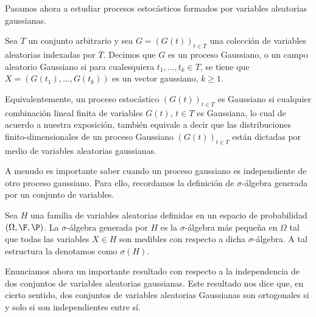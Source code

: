  Pasamos ahora a estudiar procesos estocásticos formados por variables aleatorias gaussianas.
\begin{dfn} 
 Sea $T$ un conjunto arbitrario y sea $G=(G(t))_{t\in T}$ una colección de variables aleatorias indexadas por $T$. Decimos que $G$ es un proceso Gaussiano, o un campo aleatorio Gaussiano si para cualesquiera $t_1,...,t_k\in T$, se tiene que $X=(G(t_1),...,G(t_k))$ es un vector gaussiano, $k\geq1$. 
\end{dfn}

Equivalentemente, un proceso estocástico $(G(t))_{t\in T}$ es Gaussiano si cualquier combinación lineal finita de variables $G(t)$, $t\in T$ es Gaussiana, lo cual de acuerdo a nuestra exposición, también equivale a decir que las distribuciones finito-dimensionales de un proceso Gaussiano $(G(t))_{t\in T}$ están dictadas por medio de variables aleatorias gaussianas.

A menudo es importante saber cuando un proceso gaussiano es independiente de otro proceso gaussiano. Para ello, recordamos la definición de $\sigma$-álgebra generada por un conjunto de variables.

\begin{dfn} 
 Sea $H$ una familia de variables aleatorias definidas en un espacio de probabilidad $(\Omega, \F, \P)$. La $\sigma$-álgebra generada por $H$ es la $\sigma$-álgebra más pequeña en $\Omega$ tal que todas las variables $X\in H$ son medibles con respecto a dicha $\sigma$-álgebra. A tal estructura la denotamos como $\sigma(H)$.  
 \end{dfn}
Enunciamos ahora un importante resultado con respecto a la independencia de dos conjuntos de variables aleatorias gaussianas. Este resultado nos dice que, en cierto sentido, dos conjuntos de variables aleatorias Gaussianas son ortogonales si y solo si son independientes entre sí. 

